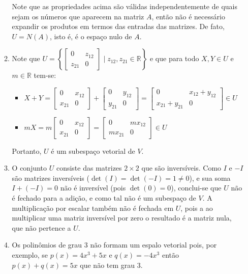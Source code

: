 \documentclass[12pt,a4paper]{article}
\newcommand*\R{\mathbb{R}}
\begin{document}
\begin{enumerate}
\begin{enumerate}
Note que as propriedades acima são válidas independentemente de quais sejam os números que aparecem na matriz $A$, então não é necessário expandir os produtos em termos das entradas das matrizes. De fato, $U = N(A)$, isto é, é o espaço nulo de $A$.

\item Note que $U = \left\{ \begin{bmatrix}
0 & z_{12}\\ z_{21} & 0
\end{bmatrix} \mid z_{12},z_{21} \in \R \right\}$ e que para todo $X, Y \in U$ e $m \in \R$ tem-se:
\begin{itemize}
\item $X + Y = \begin{bmatrix}
0 & x_{12}\\ x_{21} & 0
\end{bmatrix} + \begin{bmatrix}
0 & y_{12}\\ y_{21} & 0
\end{bmatrix}
=\begin{bmatrix}
0 & x_{12} + y_{12}\\ x_{21}+y_{21} & 0
\end{bmatrix} \in U$
\item $mX = m\begin{bmatrix}
0 & x_{12}\\ x_{21} & 0
\end{bmatrix}
=\begin{bmatrix}
0 & mx_{12} \\ mx_{21} & 0
\end{bmatrix} \in U$
\end{itemize}

Portanto, $U$ é um subespaço vetorial de $V$.

\item O conjunto $U$ consiste das matrizes $2 \times 2$ que são inversíveis. Como $I$ e $-I$ são matrizes inversíveis ($\det(I) = \det(-I) = 1 \neq 0$), e sua soma $I + (-I) = 0$ não é inversível (pois $\det(0) = 0$), conclui-se que $U$ não é fechado para a adição, e como tal não é um subespaço de $V$. A multiplicação por escalar também não é fechada em $U$, pois a ao multiplicar uma matriz inversível por zero o resultado é a matriz nula, que não pertence a $U$.
\item Os polinômios de grau 3 não formam um espalo vetorial pois, por exemplo, se $p(x) = 4x^3+5x$ e $q(x) = -4x^3$ então $p(x)+q(x) = 5x$ que  não tem grau 3.


\end{enumerate}
\end{enumerate}
\end{document}
